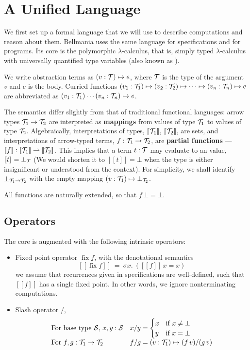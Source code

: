 \section{A Unified Language}

\newcommand\semp[1]{[\![{#1}]\!]}
\newcommand\fix{\operatorname{fix}}

We first set up a formal language that we will use to describe computations and reason about them.
Bellmania uses the same language for specifications and for programs.  Its core is the polymorphic
$\lambda$-calculus, that is, simply typed $\lambda$-calculus with universally quantified type variables 
(also known as ).

We write abstraction terms as $(v:\mathcal{T})\mapsto e$, where $\mathcal{T}$ is the type of the argument $v$ and $e$ is
the body. Curried functions $(v_1:\mathcal{T}_1)\mapsto (v_2:\mathcal{T}_2) \mapsto \cdots \mapsto (v_n:\mathcal{T}_n) \mapsto e$ are abbreviated 
as $(v_1:\mathcal{T}_1)\cdots(v_n:\mathcal{T}_n)\mapsto e$.

The semantics differ slightly from that of traditional functional languages: arrow types $\mathcal{T}_1\to\mathcal{T}_2$
are interpreted as {\bf mappings} from values of type $\mathcal{T}_1$ to values of type $\mathcal{T}_2$. Algebraically,
interpretations of types, $\semp{\T_1}$, $\semp{\T_2}$, are sets, and interpretations of arrow-typed terms,
$f : \mathcal{T}_1\to\mathcal{T}_2$, are {\bf partial functions} --- $\semp{f} : \semp{\T_1}\rightharpoonup\semp{\T_2}$.
This implies that a term $t : \mathcal{T}$ may evaluate to an  value, $\semp{t}=\bot_\T$
(We would shorten it to $\semp{t}=\bot$ when the type is either insignificant or understood from the context).
For simplicity, we shall identify $\bot_{\mathcal{T}_1\to\mathcal{T}_2}$ with the empty mapping $(v:\mathcal{T}_1)\mapsto\bot_{\mathcal{T}_2}$.

All functions are naturally extended, so that $f\,\bot=\bot$.

\subsection{Operators}
\label{lang:operators}

The core is augmented with the following intrinsic operators:

\begin{itemize}
  \item Fixed point operator $\fix f$, with the denotational semantics
    \[\semp{\fix f} ~=~ \sigma x.~ (\semp f\,x=x)\]
  we assume that recurrences given in specifications are well-defined, 
  such that $\semp f$ has a single fixed point.
  In other words, we ignore nonterminating computations.
  \item Slash operator $/$,
  \[\begin{array}{ll}
      \mbox{For base type $\mathcal{S}$, $x,y:\mathcal{S}$} & x/y = \begin{cases}x & \mbox{if }x\neq\bot \\ y & \mbox{if }x=\bot\end{cases} \\
      \mbox{For $f,g:\mathcal{T}_1\to\mathcal{T}_2$} & f/g = (v:\mathcal{T}_1)\mapsto (f\,v)/(g\,v)
    \end{array}\]
\end{itemize}

